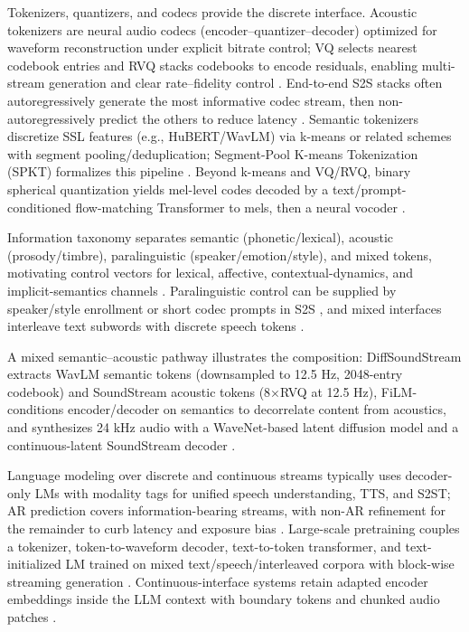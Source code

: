 \documentclass{article}
\begin{document}
Tokenizers, quantizers, and codecs provide the discrete interface. Acoustic tokenizers are neural audio codecs (encoder–quantizer–decoder) optimized for waveform reconstruction under explicit bitrate control; VQ selects nearest codebook entries and RVQ stacks codebooks to encode residuals, enabling multi-stream generation and clear rate–fidelity control \cite{guo2025recentadvancesdiscretespeechtokensreview}. End-to-end S2S stacks often autoregressively generate the most informative codec stream, then non-autoregressively predict the others to reduce latency \cite{peng2024mslms2stmultitaskspeechlanguagemodeltext}. Semantic tokenizers discretize SSL features (e.g., HuBERT/WavLM) via k-means or related schemes with segment pooling/deduplication; Segment-Pool K-means Tokenization (SPKT) formalizes this pipeline \cite{kando2025exploringeffectsegmentationvocabularysiz}. Beyond k-means and VQ/RVQ, binary spherical quantization yields mel-level codes decoded by a text/prompt-conditioned flow-matching Transformer to mels, then a neural vocoder \cite{wang2025tadicodectextawarediffusionspeechtokeniz}.

Information taxonomy separates semantic (phonetic/lexical), acoustic (prosody/timbre), paralinguistic (speaker/emotion/style), and mixed tokens, motivating control vectors for lexical, affective, contextual-dynamics, and implicit-semantics channels \cite{guo2025recentadvancesdiscretespeechtokensreview,wang2025bossbeyondsemanticspeech}. Paralinguistic control can be supplied by speaker/style enrollment or short codec prompts in S2S \cite{wu2024speechcomposerunifyingmultiplespeechtask,peng2024mslms2stmultitaskspeechlanguagemodeltext}, and mixed interfaces interleave text subwords with discrete speech tokens \cite{wu2024speechcomposerunifyingmultiplespeechtask}.

A mixed semantic–acoustic pathway illustrates the composition: DiffSoundStream extracts WavLM semantic tokens (downsampled to 12.5 Hz, 2048-entry codebook) and SoundStream acoustic tokens (8×RVQ at 12.5 Hz), FiLM-conditions encoder/decoder on semantics to decorrelate content from acoustics, and synthesizes 24 kHz audio with a WaveNet-based latent diffusion model and a continuous-latent SoundStream decoder \cite{yang2025diffsoundstreamefficientspeechtokenizati}.

Language modeling over discrete and continuous streams typically uses decoder-only LMs with modality tags for unified speech understanding, TTS, and S2ST; AR prediction covers information-bearing streams, with non-AR refinement for the remainder to curb latency and exposure bias \cite{wu2024speechcomposerunifyingmultiplespeechtask,peng2024mslms2stmultitaskspeechlanguagemodeltext}. Large-scale pretraining couples a tokenizer, token-to-waveform decoder, text-to-token transformer, and text-initialized LM trained on mixed text/speech/interleaved corpora with block-wise streaming generation \cite{zeng2024scalingspeechtextpretrainingsyntheticint}. Continuous-interface systems retain adapted encoder embeddings inside the LLM context with boundary tokens and chunked audio patches \cite{nguyen2025qwenvsgemmaintegrationwhispercomparative,shu2023llasmlargelanguagespeechmodel}.
\end{document}

